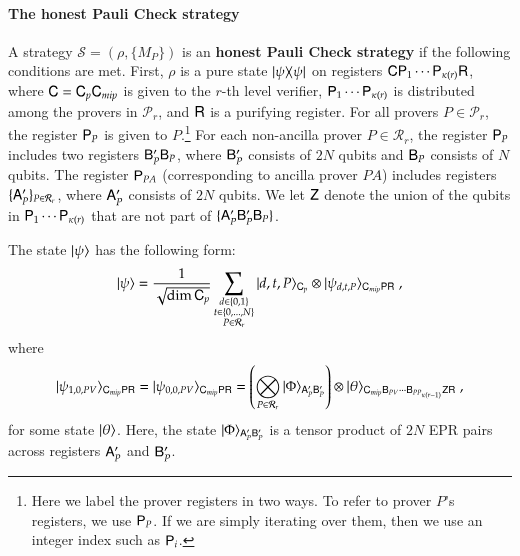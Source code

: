 \paragraph{The honest Pauli Check strategy}
A strategy $\mathcal{S} = (\rho,\{ M_P \})$ is an \textbf{honest Pauli Check strategy} if the following conditions are met. First, $\rho$ is a pure state $|\psi\rangle\! \langle \psi|$ on registers ${\mathsf{C}} {\mathsf{P}}_1 \cdots {\mathsf{P}}_{\kappa(r)} {\mathsf{R}}$, where ${\mathsf{C}} = {\mathsf{C}}_p {\mathsf{C}}_{mip}$ is given to the $r$-th level verifier, ${\mathsf{P}}_1 \cdots {\mathsf{P}}_{\kappa(r)}$ is distributed among the provers in $\mathcal{P}_r$, and ${\mathsf{R}}$ is a purifying register. For all provers $P \in \mathcal{P}_r$, the register ${\mathsf{P}}_P$ is given to $P$.\footnote{Here we label the prover registers in two ways. To refer to prover $P$'s registers, we use ${\mathsf{P}}_P$. If we are simply iterating over them, then we use an integer index such as ${\mathsf{P}}_i$.}  For each non-ancilla prover $P \in \mathcal{R}_r$, the register ${\mathsf{P}}_P$ includes two registers ${\mathsf{B}}'_P {\mathsf{B}}_P$, where ${\mathsf{B}}'_P$ consists of $2N$ qubits and ${\mathsf{B}}_P$ consists of $N$ qubits. The register ${\mathsf{P}}_{PA}$ (corresponding to ancilla prover $PA$) includes registers $\{ {\mathsf{A}}_P' \}_{P \in \mathcal{R}_r}$, where ${\mathsf{A}}_P'$ consists of $2N$ qubits. We let ${\mathsf{Z}}$ denote the union of the qubits in ${\mathsf{P}}_1 \cdots {\mathsf{P}}_{\kappa(r)}$ that are not part of $\{ {\mathsf{A}}_P' {\mathsf{B}}_P' {\mathsf{B}}_P \}$. 

The state $|\psi\rangle$ has the following form:
\begin{equation}
	\ket{\psi} = \frac{1}{\sqrt{\dim \sC_p}} \sum_{\substack{d \in \set{0,1} \\ t \in \set{0,\ldots,N} \\ P \in \mathcal{R}_r}} \ket{d,t,P}_{\sC_p} \otimes \ket{\psi_{d,t,P}}_{\sC_{mip} \sP \sR}\;,
	\label{eq:honest-psi}
\end{equation}
where 
\[
	|\psi_{1,0,PV}\rangle_{{\mathsf{C}}_{mip} {\mathsf{P}} {\mathsf{R}}} = |\psi_{0,0,PV}\rangle_{{\mathsf{C}}_{mip} {\mathsf{P}} {\mathsf{R}}} = \left( \bigotimes_{P \in \mathcal{R}_r} |\Phi\rangle_{{\mathsf{A}}_P' {\mathsf{B}}_P'}\right) \otimes |\theta\rangle_{{\mathsf{C}}_{mip} {\mathsf{B}}_{PV} \cdots {\mathsf{B}}_{PP_{\kappa(r-1)}} {\mathsf{Z}} {\mathsf{R}}}\;,
\]%
for some state $|\theta\rangle$. Here, the state $|\Phi\rangle_{{\mathsf{A}}_P' {\mathsf{B}}_P'}$ is a tensor product of $2N$ EPR pairs across registers ${\mathsf{A}}_P'$ and ${\mathsf{B}}_P'$. 

